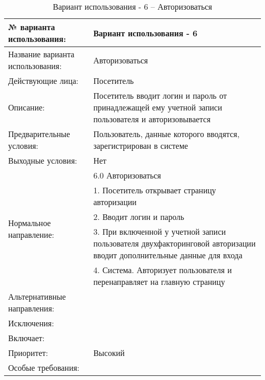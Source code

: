 \begin{table}[H]
  \caption{Вариант использования - 6 – Авторизоваться}\label{use-case-6-table}
  \begin{tabular}{|p{6cm}|p{10cm}|}
  \hline № варианта использования: & Вариант использования - 6 \\
  \hline Название варианта использования: & Авторизоваться \\
  \hline Действующие лица: & Посетитель \\
  \hline Описание: & Посетитель вводит логин и пароль от принадлежащей ему учетной записи пользователя и авторизовывается \\
  \hline Предварительные условия: & Пользователь, данные которого вводятся, зарегистрирован в системе \\
  \hline Выходные условия: & Нет \\
  \hline \multirow{5}{*}{Нормальное направление:} & 6.0 Авторизоваться \\
  \cline{2-2} & 1. Посетитель открывает страницу авторизации \\
  \cline{2-2} & 2. Вводит логин и пароль \\
  \cline{2-2} & 3. При включенной у учетной записи пользователя двухфакторинговой авторизации вводит дополнительные данные для входа \\
  \cline{2-2} & 4. Система. Авторизует пользователя и перенаправляет на главную страницу \\
  \hline Альтернативные направления: &  \\
  \hline Исключения: &  \\
  \hline Включает: &  \\
  \hline Приоритет: & Высокий \\
  \hline Особые требования: &  \\
  \hline
  \end{tabular}
\end{table}

